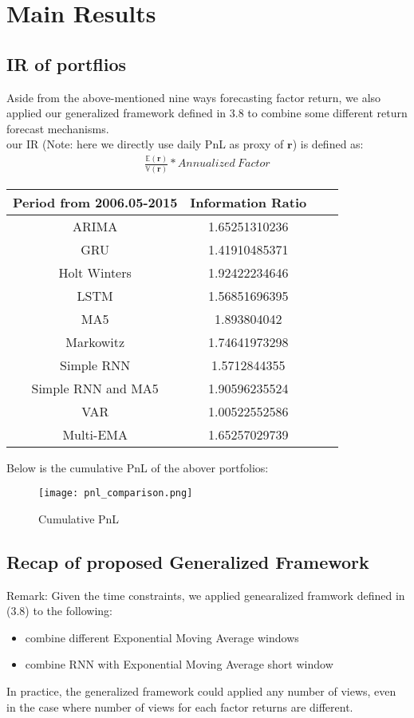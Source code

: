 \documentclass[12pt]{article}
\numberwithin{equation}{section}
\begin{document}
\section{Main Results}
\subsection{IR of portflios}
Aside from the above-mentioned nine ways forecasting factor return, we also applied our generalized framework defined in 3.8 to combine some different return forecast mechanisms.\\
our IR (Note: here we directly use daily PnL as proxy of $\textbf{r}$) is defined as:
\begin{align}
\frac{\mathbb{E}(\textbf{r})}{\mathbb{V}(\textbf{r})} * Annualized \ Factor 
\end{align}
\begin{center}
\begin{tabular}{ |c|c|c|c| }
\hline
Period from 2006.05-2015 & Information Ratio \\
\hline
ARIMA & 1.65251310236 \\
GRU & 1.41910485371  \\
Holt Winters & 1.92422234646  \\
LSTM & 1.56851696395 \\
MA5 & 1.893804042  \\
Markowitz & 1.74641973298  \\
Simple RNN & 1.5712844355 \\
Simple RNN and MA5 & 1.90596235524  \\
VAR & 1.00522552586  \\
Multi-EMA & 1.65257029739  \\
\hline
\end{tabular}
\end{center}
Below is the cumulative PnL of the abover portfolios:

\begin{figure}[H]
  \begin{center}
  \texttt{[image: pnl\_comparison.png]}
  \caption{Cumulative PnL}
  \label{fig:1}
  \end{center}
\end{figure}

\subsection{Recap of proposed Generalized Framework}
\noindent
Remark: Given the time constraints, we applied genearalized framwork defined in (3.8) to the following:
\begin{itemize}
      \item combine different Exponential Moving Average windows 
      \item combine RNN with Exponential Moving Average short window
\end{itemize}
In practice, the generalized framework could applied any number of views, even in the case where number of views for each factor returns are different.
\end{document}
